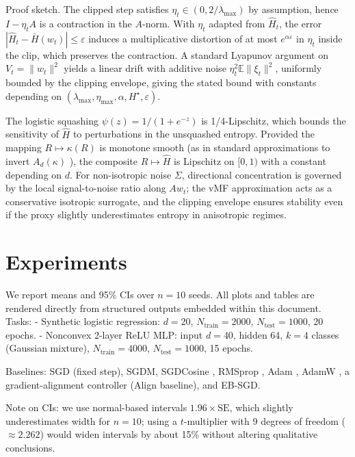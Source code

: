 \noindent Proof sketch. The clipped step satisfies $\eta_t\in(0,2/\lambda_{\max})$ by assumption, hence $I-\eta_t A$ is a contraction in the $A$-norm. With $\eta_t$ adapted from $\widehat{H}_t$, the error $|\widehat{H}_t-\bar{H}(w_t)|\le\varepsilon$ induces a multiplicative distortion of at most $e^{\alpha\varepsilon}$ in $\eta_t$ inside the clip, which preserves the contraction. A standard Lyapunov argument on $V_t=\|w_t\|^2$ yields a linear drift with additive noise $\eta_t^2\mathbb{E}\|\xi_t\|^2$, uniformly bounded by the clipping envelope, giving the stated bound with constants depending on $(\lambda_{\max},\eta_{\max},\alpha,H^\star,\varepsilon)$.

\begin{remark}
The logistic squashing $\psi(z)=1/(1+e^{-z})$ is 1/4-Lipschitz, which bounds the sensitivity of $\widehat{H}$ to perturbations in the unsquashed entropy. Provided the mapping $R\mapsto \kappa(R)$ is monotone smooth (as in standard approximations to invert $A_d(\kappa)$ \cite{MardiaJupp2000Directional}), the composite $R\mapsto \widehat{H}$ is Lipschitz on $[0,1)$ with a constant depending on $d$. For non-isotropic noise $\Sigma$, directional concentration is governed by the local signal-to-noise ratio along $Aw_t$; the vMF approximation acts as a conservative isotropic surrogate, and the clipping envelope ensures stability even if the proxy slightly underestimates entropy in anisotropic regimes.
\end{remark}

\section{Experiments}
We report means and 95\% CIs over $n{=}10$ seeds. All plots and tables are rendered directly from structured outputs embedded within this document. Tasks:
- Synthetic logistic regression: $d{=}20$, $N_{\text{train}}{=}2000$, $N_{\text{test}}{=}1000$, 20 epochs.
- Nonconvex 2-layer ReLU MLP: input $d{=}40$, hidden 64, $k{=}4$ classes (Gaussian mixture), $N_{\text{train}}{=}4000$, $N_{\text{test}}{=}1000$, 15 epochs.

Baselines: SGD (fixed step), SGDM, SGDCosine \cite{Loshchilov2017SGDRICLR}, RMSprop \cite{Tieleman2012RMSprop}, Adam \cite{Kingma2015AdamICLR}, AdamW \cite{Loshchilov2019AdamWICLR}, a gradient-alignment controller (Align baseline), and EB-SGD.

Note on CIs: we use normal-based intervals $1.96\times \text{SE}$, which slightly underestimates width for $n{=}10$; using a $t$-multiplier with 9 degrees of freedom ($\approx 2.262$) would widen intervals by about 15\% without altering qualitative conclusions.


